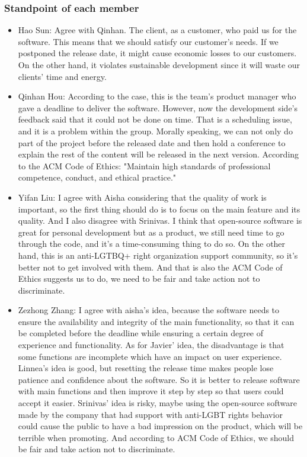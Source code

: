 		\subsubsection{Standpoint of each member}
		\begin{itemize}
  			\item Hao Sun: Agree with Qinhan. The client, as a customer, who paid us for the software. This means that we should satisfy our customer's needs. If we postponed the release date, it might cause economic losses to our customers. On the other hand, it violates sustainable development since it will waste our clients' time and energy.
  			\item Qinhan Hou: According to the case, this is the team's product manager who gave a deadline to deliver the software. However, now the development side's feedback said that it could not be done on time. That is a scheduling issue, and it is a problem within the group. Morally speaking, we can not only do part of the project before the released date and then hold a conference to explain the rest of the content will be released in the next version. According to the ACM Code of Ethics: "Maintain high standards of professional competence, conduct, and ethical practice."
  			\item Yifan Liu: I agree with Aisha considering that the quality of work is important, so the first thing should do is to focus on the main feature and its quality. And I also disagree with Srinivas. I think that open-source software is great for personal development but as a product, we still need time to go through the code, and it's a time-consuming thing to do so. On the other hand, this is an anti-LGTBQ+ right organization support community, so it's better not to get involved with them. 
  			And that is also the ACM Code of Ethics suggests us to do, we need to be fair and take action not to discriminate.
  			\item Zezhong Zhang: I agree with aisha's idea, because the software needs to ensure the availability and integrity of the main functionality, so that it can be completed before the deadline while ensuring a certain degree of experience and functionality. As for Javier' idea, the disadvantage is that some functions are incomplete which have an impact on user experience. Linnea's idea is good, but resetting the release time makes people lose patience and confidence about the software. So it is better to release software with main functions and then improve it step by step so that users could accept it easier. Srinivas' idea is risky, maybe using the open-source software made by the company that had support with anti-LGBT rights behavior could cause the public to have a bad impression on the product, which will be terrible when promoting. And according to ACM Code of Ethics, we should be fair and take action not to discriminate.
		\end{itemize}
